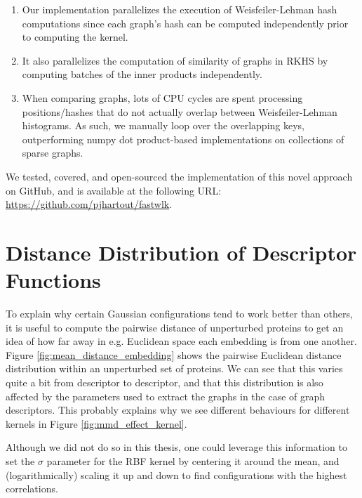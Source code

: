 \begin{enumerate}
\item Our implementation parallelizes the execution of Weisfeiler-Lehman hash
computations since each graph's hash can be computed independently prior to
computing the kernel.
\item It also parallelizes the computation of similarity of graphs in RKHS by
computing batches of the inner products independently.
\item When comparing graphs, lots of CPU cycles are spent processing
positions/hashes that do not actually overlap between Weisfeiler-Lehman
histograms. As such, we manually loop over the overlapping keys, outperforming
numpy dot product-based implementations on collections of sparse graphs.
\end{enumerate}

We tested, covered, and open-sourced the implementation of this novel approach
on GitHub, and is available at the following URL: \url{https://github.com/pjhartout/fastwlk}.

\section{Distance Distribution of Descriptor Functions}\label{sec:distance_dist}
To explain why certain Gaussian configurations tend to work better than others,
it is useful to compute the pairwise distance of unperturbed proteins to get an
idea of how far away in e.g. Euclidean space each embedding is from one
another. Figure \ref{fig:mean_distance_embedding} shows the pairwise Euclidean
distance distribution within an unperturbed set of proteins. We can see that
this varies quite a bit from descriptor to descriptor, and that this
distribution is also affected by the parameters used to extract the graphs in
the case of graph descriptors. This probably explains why we see different
behaviours for different kernels in Figure \ref{fig:mmd_effect_kernel}.

Although we did not do so in this thesis, one could leverage this information to
set the $\sigma$ parameter for the RBF kernel by centering it around the mean,
and (logarithmically) scaling it up and down to find configurations with the
highest correlations.

